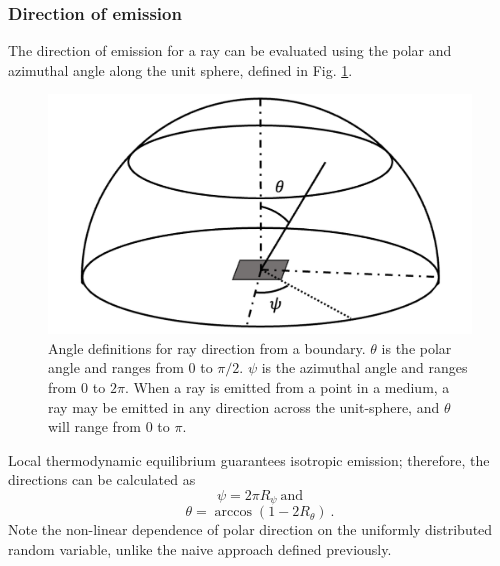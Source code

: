 \subsubsection{Direction of emission}
The direction of emission for a ray can be evaluated using the polar and azimuthal angle along the unit sphere, defined in Fig. \ref{fig:Unit_Sphere}. 
\begin{figure}
\centering
\includegraphics[width=0.7\linewidth]{figures/ch3/solid_angl.png}
\caption{Angle definitions for ray direction from a boundary. $\theta$ is the polar angle and ranges from $0$ to $\pi/2$. $\psi$ is the azimuthal angle and ranges from $0$ to $2\pi$. When a ray is emitted from a point in a medium, a ray may be emitted in any direction across the unit-sphere, and $\theta{}$ will range from $0$ to $\pi$.}
\label{fig:Unit_Sphere}
\end{figure}
Local thermodynamic equilibrium guarantees isotropic emission; therefore, the directions can be calculated as
\begin{equation}
    \psi{} = 2\pi{}R_\psi{}~\text{and}
    \label{eq:DirOfEmission_psi}
\end{equation}
\begin{equation}
    \theta{}=\arccos{(1-2R_\theta{})}~.
    \label{eq:DirOfEmission_theta}
\end{equation}
Note the non-linear dependence of polar direction on the uniformly distributed random variable, unlike the naive approach defined previously.

